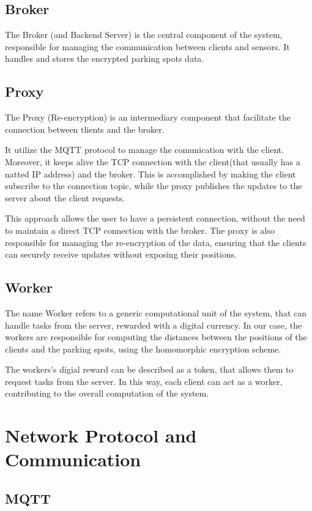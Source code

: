 \documentclass[12pt,a4paper,twoside]{book}
\begin{document}
\subsection{Broker}
The Broker (and Backend Server) is the central component of the system, responsible for managing the communication between clients and sensors. It handles and stores the encrypted parking spots data.

\subsection{Proxy}
The Proxy (Re-encryption) is an intermediary component that facilitate the connection between tlients and the broker.

It utilize the MQTT protocol to manage the comunication with the client. Moreover, it keeps alive the TCP connection with the client(that usually has a natted IP address) and the broker.
This is accomplished by making the client subscribe to the connection topic, while the proxy publishes the updates to the server about the client requests.

This approach allows the user to have a persistent connection, without the need to maintain a direct TCP connection with the broker. The proxy is also responsible for managing the re-encryption of the data, ensuring that the clients can securely receive updates without exposing their positions.

\subsection{Worker}
The name Worker refers to a generic computational unit of the system, that can handle tasks from the server, rewarded with a digital currency. In our case, the workers are responsible for computing the distances between the positions of the clients and the parking spots, using the homomorphic encryption scheme. 

The workers's digial reward can be described as a token, that allows them to request tasks from the server. In this way, each client can act as a worker, contributing to the overall computation of the system.

\section{Network Protocol and Communication}
\subsection{MQTT}
\end{document}
